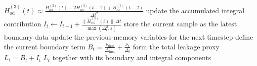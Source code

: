 \begin{algorithm}[H]
\begin{algorithmic}[1]
    \(
    \ddot H_{\mathrm{od}}^{(3)}(t)\approx
    \frac{H_{\mathrm{od}}^{(3)}(t)-2H_{\mathrm{od}}^{(3)}(t-1)+H_{\mathrm{od}}^{(3)}(t-2)}{\Delta t^2}
    \)
    \State update the accumulated integral contribution
    \(
    I_t \leftarrow I_{t-1}
    +
    \frac{\|\ddot H_{\mathrm{od}}^{(3)}(t)\|\,\Delta t}{\max(\Delta_t^2,\varepsilon)}
    \)
\EndIf
\State store the current sample as the latest boundary data
\State update the previous-memory variables for the next timestep
\State define the current boundary term
\(
B_t=\frac{\nu_{\mathrm{first}}}{\Delta_{\mathrm{first}}}
+
\frac{\nu_t}{\Delta_t}
\)
\State form the total leakage proxy
\(
L_t = B_t + I_t
\)
\State \Return $L_t$ together with its boundary and integral components
\end{algorithmic}
\end{algorithm}

\newpage
